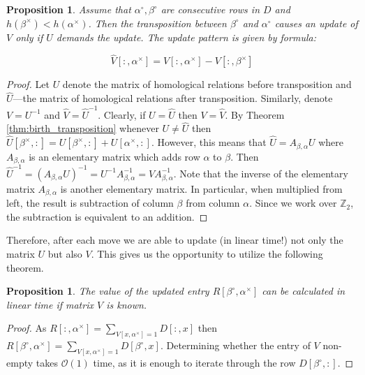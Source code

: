 \documentclass[a4paper,12pt, USenglish,cleveref,autoref,thm-restate]{article}
\newtheorem{proposition}[theorem]{Proposition}
\newcommand{\mf}{h}
\newcommand{\mU}{U}
\newcommand{\hmUaft}{\hat{\mU}}
\newcommand{\hmUbef}{\mU}
\newcommand{\mR}{R}
\newcommand{\mV}{V}
\newcommand{\mD}{D}
\newcommand{\bth}[1]{#1^\circ}
\newcommand{\dth}[1]{#1^{\!\times}}
\newcommand{\ZZ}{\mathbb{Z}}
\newcommand{\bds}{\alpha}
\newcommand{\bdt}{\beta}
\begin{document}
\begin{appendices}
\begin{proposition}\label{prop:update_V}
 Assume that $\bth\bds,\bth\bdt$ are consecutive rows in $\mD$  and $\mf(\dth\bdt) < \mf(\dth\bds)$. Then the transposition between $\bth\bdt$ and $\bth\bds$ causes an update of $V$ only if $\mU$ demands the update. The update pattern is given by formula:

$$\hat{\mV}[:,\dth\bds] = \mV[:,\dth\bds] - \mV[:,\dth\bdt]$$
\end{proposition}

\begin{proof}
    Let $\mU$ denote the matrix of homological relations before transposition and $\hat{\mU}$---the matrix of homological relations after transposition. 
    Similarly, denote $\mV = \mU^{-1}$ and $\hat{\mV}=\hat{\mU}^{-1}$. 
    Clearly, if $\mU = \hat{\mU}$ then $\mV = \hat{\mV}$. 
    By Theorem \ref{thm:birth_transposition} whenever $\mU \neq \hat{\mU}$ then $\hmUaft[\dth\bdt,:] = \hmUbef[\dth\bdt,:]+\hmUbef[\dth\bds,:]$. 
    However, this means that $\hmUaft = A_{\bdt,\bds} \mU $ where $A_{\bdt,\bds}$ is an elementary matrix which adds row $\bds$ to $\bdt$. Then $\hmUaft^{-1} = (A_{\bdt,\bds}\mU )^{-1} = \mU^{-1}A_{\bdt,\bds}^{-1} =  \mV A_{\bdt,\bds}^{-1}$. 
    Note that the inverse of the elementary matrix $A_{\bdt,\bds}$ is another elementary matrix. 
    In particular, when multiplied from left, the result is subtraction of column $\bdt$ from column $\bds$.
    Since we work over $\ZZ_2$, the subtraction is equivalent to an addition.
\end{proof}

\noindent Therefore, after each move we are able to update (in linear time!) not only the matrix $\mU$ but also $\mV$. This gives us the opportunity to utilize the following theorem.


\begin{proposition}\label{prop:calculating_R}
    The value of the updated entry $\mR[\bth\bdt,\dth\bds]$ can be calculated in linear time if matrix $\mV$ is known.
\end{proposition}

\begin{proof}
 As $\mR[:,\dth\bds] = \sum\limits_{\mV[x,\dth\bds] = 1} \mD[:,x]$ then $\mR[\bth\bdt,\dth\bds] = \sum\limits_{\mV[x,\dth\bds] = 1} \mD[\bth\bdt,x]$. 
 Determining whether the entry of $\mV$ non-empty takes $\mathcal{O}(1)$ time, 
    as it is enough to iterate through the row $\mD[\bth\bdt,:]$.
\end{proof}



\end{appendices}
\end{document}
